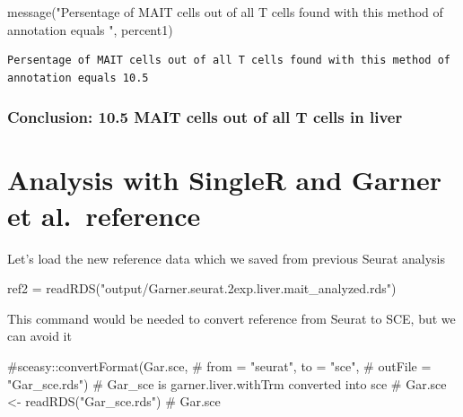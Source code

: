 \documentclass[
  letterpaper,
  DIV=11,
  numbers=noendperiod]{scrartcl}
\newenvironment{Shaded}{\begin{snugshade}}{\end{snugshade}}
\newcommand{\CommentTok}[1]{\textcolor[rgb]{0.37,0.37,0.37}{#1}}
\newcommand{\FunctionTok}[1]{\textcolor[rgb]{0.28,0.35,0.67}{#1}}
\newcommand{\NormalTok}[1]{\textcolor[rgb]{0.00,0.23,0.31}{#1}}
\newcommand{\OtherTok}[1]{\textcolor[rgb]{0.00,0.23,0.31}{#1}}
\newcommand{\StringTok}[1]{\textcolor[rgb]{0.13,0.47,0.30}{#1}}
\begin{document}
\begin{Shaded}
\begin{Highlighting}[]
\FunctionTok{message}\NormalTok{(}\StringTok{"Persentage of MAIT cells out of all T cells found with this method of annotation equals "}\NormalTok{, percent1)}
\end{Highlighting}
\end{Shaded}

\begin{verbatim}
Persentage of MAIT cells out of all T cells found with this method of annotation equals 10.5
\end{verbatim}

\hypertarget{conclusion-10.5-mait-cells-out-of-all-t-cells-in-liver}{%
\subsubsection{Conclusion: 10.5 MAIT cells out of all T cells in
liver}\label{conclusion-10.5-mait-cells-out-of-all-t-cells-in-liver}}

\hypertarget{analysis-with-singler-and-garner-et-al.-reference}{%
\section{Analysis with SingleR and Garner et
al.~reference}\label{analysis-with-singler-and-garner-et-al.-reference}}

Let's load the new reference data which we saved from previous Seurat
analysis

\begin{Shaded}
\begin{Highlighting}[]
\NormalTok{ref2 }\OtherTok{=} \FunctionTok{readRDS}\NormalTok{(}\StringTok{"output/Garner.seurat.2exp.liver.mait\_analyzed.rds"}\NormalTok{)}
\end{Highlighting}
\end{Shaded}

This command would be needed to convert reference from Seurat to SCE,
but we can avoid it

\begin{Shaded}
\begin{Highlighting}[]
\CommentTok{\#sceasy::convertFormat(Gar.sce,}
  \CommentTok{\# from = "seurat", to = "sce",}
  \CommentTok{\# outFile = "Gar\_sce.rds")}
\CommentTok{\# Gar\_sce is garner.liver.withTrm converted into sce}
\CommentTok{\# Gar.sce \textless{}{-} readRDS("Gar\_sce.rds")}
\CommentTok{\# Gar.sce}
\end{Highlighting}
\end{Shaded}
\end{document}
